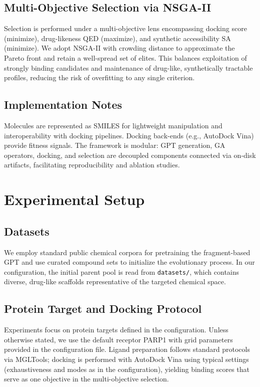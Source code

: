 \documentclass[lettersize,journal]{IEEEtran}
\begin{document}
\subsection{Multi-Objective Selection via NSGA-II}
Selection is performed under a multi-objective lens encompassing docking score (minimize), drug-likeness QED (maximize), and synthetic accessibility SA (minimize). We adopt NSGA-II with crowding distance to approximate the Pareto front and retain a well-spread set of elites. This balances exploitation of strongly binding candidates and maintenance of drug-like, synthetically tractable profiles, reducing the risk of overfitting to any single criterion.

\subsection{Implementation Notes}
Molecules are represented as SMILES for lightweight manipulation and interoperability with docking pipelines. Docking back-ends (e.g., AutoDock Vina) provide fitness signals. The framework is modular: GPT generation, GA operators, docking, and selection are decoupled components connected via on-disk artifacts, facilitating reproducibility and ablation studies.


\section{Experimental Setup}
\subsection{Datasets}
We employ standard public chemical corpora for pretraining the fragment-based GPT and use curated compound sets to initialize the evolutionary process. In our configuration, the initial parent pool is read from \texttt{datasets/}, which contains diverse, drug-like scaffolds representative of the targeted chemical space.
\subsection{Protein Target and Docking Protocol}
Experiments focus on protein targets defined in the configuration. Unless otherwise stated, we use the default receptor PARP1 with grid parameters provided in the configuration file. Ligand preparation follows standard protocols via MGLTools; docking is performed with AutoDock Vina using typical settings (exhaustiveness and modes as in the configuration), yielding binding scores that serve as one objective in the multi-objective selection.
\end{document}
